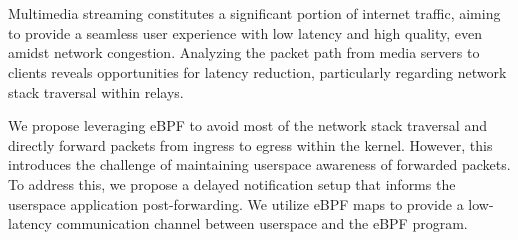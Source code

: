\chapter{\abstractname}



Multimedia streaming constitutes a significant portion of internet traffic,
aiming to provide a seamless user experience with low latency and high quality, 
even amidst network congestion. 
Analyzing the packet path from media servers to clients reveals opportunities 
for latency reduction, particularly regarding network stack traversal within relays.

We propose leveraging eBPF to avoid most of the network stack traversal and directly 
forward packets from ingress to egress within the kernel.
However, this introduces the challenge of maintaining userspace awareness of 
forwarded packets. 
To address this, we propose a delayed notification setup that informs the userspace
application post-forwarding. 
We utilize eBPF maps to provide a low-latency communication channel between userspace 
and the eBPF program.

